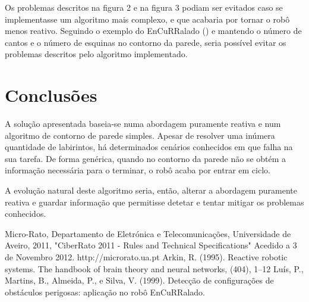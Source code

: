 \documentclass[citeauthoryear]{llncs} %
\begin{document}
Os problemas descritos na figura 2 e na figura 3 podiam ser evitados caso se implementasse um algoritmo mais complexo, e que acabaria por tornar o robô menos reativo. Seguindo o exemplo do EnCuRRalado (\cite{encur}) e mantendo o número de cantos e o número de esquinas no contorno da parede, seria possível evitar os problemas descritos pelo algoritmo implementado.

\section{Conclusões}

A solução apresentada baseia-se numa abordagem puramente reativa e num algoritmo de contorno de parede simples. Apesar de resolver uma inúmera quantidade de labirintos, há determinados cenários conhecidos em que falha na sua tarefa. De forma genérica, quando no contorno da parede não se obtém a informação necessária para o terminar, o robô acaba por entrar em ciclo.

A evolução natural deste algoritmo seria, então, alterar a abordagem puramente reativa e guardar informação que permitisse detetar e tentar mitigar os problemas conhecidos.

\begingroup
\renewcommand\refname{Referências}
\begin{thebibliography}{}

Micro-Rato, Departamento de Eletrónica e Telecomunicações, Universidade de Aveiro, 2011, "CiberRato 2011 - Rules and Technical Specifications" Acedido a 3 de Novembro 2012. http://microrato.ua.pt
Arkin, R. (1995). Reactive robotic systems. The handbook of brain theory and neural networks, (404), 1–12
Luís, P., Martins, B., Almeida, P., e Silva, V. (1999). Detecção de configurações de obstáculos perigosas: aplicação no robô EnCuRRalado. 
\end{thebibliography}
\endgroup
\end{document}
